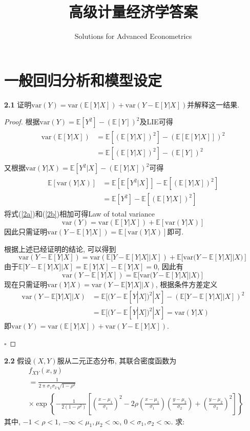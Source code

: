 \documentclass[cn,12pt,math=mtpro2,citestyle=gb7714-2015,bibstyle=gb7714-2015,twocol,mode=simple]{elegantbook}
\title{高级计量经济学答案}
\subtitle{Solutions for Advanced Econometrics}
\newcommand{\E}{\mathbb{E}}
\newcommand{\var}{\text{var}}
\begin{document}
\maketitle
\frontmatter

\mainmatter
\chapter*{一般回归分析和模型设定}
\textbf{2.1} 证明$\var(Y)=\var(\E[Y|X])+\var(Y-\E[Y|X])$并解释这一结果.

\begin{proof}
      根据$\var(Y)=\E[Y^2]-(\E[Y])^2$及LIE可得
      \begin{align}\label{2a}
      \begin{split}
      \var(\E[Y|X])&=\E[(\E[Y|X])^2]-(\E[\E[Y|X]])^2 \\
      &=\E[(\E[Y|X])^2]-(\E[Y])^2
      \end{split} \tag{2.1}
      \end{align}
      又根据$\var(Y|X)=\E[Y^2|X]-(\E[Y|X])^2$可得
      \begin{align}\label{2b}
      \begin{split}
      \E[\var(Y|X)]&=\E[\E[Y^2|X]]-\E[(\E[Y|X])^2]  \\
      &=\E[Y^2]-\E[(\E[Y|X])^2]
      \end{split}\tag{2.2}
      \end{align}
      将式(\ref{2a})和(\ref{2b})相加可得Law of total variance
      $$\var(Y)=\var(\E[Y|X])+\E[\var(Y|X)]$$
      因此只需证明$\var(Y-\E[Y|X])=\E[\var(Y|X)]$即可.

      根据上述已经证明的结论, 可以得到
      $$\var(Y-\E[Y|X])=\var(\E[Y-\E[Y|X]|X])+\E[\var(Y-\E[Y|X]|X)] $$
      由于$\E[Y-\E[Y|X]|X]=\E[Y|X]-\E[Y|X]=0$, 因此有
      $$\var(Y-\E[Y|X])=\E[\var(Y-\E[Y|X]|X)]$$
      现在只需证明$\var(Y|X)=\var(Y-\E[Y|X]|X)$, 根据条件方差定义
      \begin{align}
      \var(Y-\E[Y|X]|X)&=\E[(Y-\E[Y|X])^2|X]-(\E[Y-\E[Y|X]|X])^2 \nonumber \\
      &=\E[(Y-\E[Y|X])^2|X]=\var(Y|X) \nonumber
      \end{align}
      即$\var(Y)=\var(\E[Y|X])+\var(Y-\E[Y|X])$.

      $\square$
\end{proof}

\textbf{2.2} 假设$(X,Y)$服从二元正态分布, 其联合密度函数为
\begin{align}
&f_{XY}(x,y) \nonumber \\
&=\frac{1}{2\uppi\sigma_1\sigma_2\sqrt{1-\rho^2}} \nonumber \\
&\times \exp\left\{-\frac{1}{2(1-\rho^2)}\left[\left(\frac{x-\mu_1}{\sigma_1}\right)^2-2\rho\left(\frac{x-\mu_1}{\sigma_1}\right)\left(\frac{y-\mu_2}{\sigma_2}\right)+\left(\frac{y-\mu_2}{\sigma_2}\right)^2 \right] \right\} \nonumber
\end{align}
其中, $-1<\rho<1$, $-\infty<\mu_1,\mu_2<\infty$, $0<\sigma_1, \sigma_2<\infty$. 求:
\end{document}

